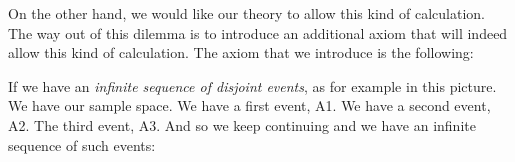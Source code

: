 \documentclass[pdftex, brazil, 12pt, twoside]{article}
\begin{document}
\begin{figure}[H]
  \begin{center}
  \end{center}
\end{figure}

On the other hand, we would like our theory to allow this
kind of calculation.
The way out of this dilemma is to introduce an additional
axiom that will indeed allow this kind of calculation.
The axiom that we introduce is the following:

\begin{figure}[H]
  \begin{center}
  \end{center}
\end{figure}

If we have an \emph{infinite sequence of disjoint events},
as for example in this picture.
We have our sample space.
We have a first event, A1.
We have a second event, A2.
The third event, A3.
And so we keep continuing and we have an infinite sequence
of such events:

\begin{figure}[H]
  \begin{center}
  \end{center}
\end{figure}
\end{document}
